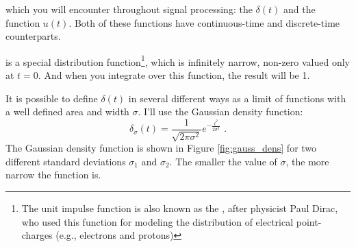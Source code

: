 %
% 
%
 which you will encounter throughout signal processing: the \emph{} $\delta(t)$ and the \emph{} function $u(t)$. Both of these functions have continuous-time and discrete-time counterparts.

 is a special distribution function\footnote{The unit impulse function is also known as the \emph{}, after physicist Paul Dirac, who used this function for modeling the distribution of electrical point-charges (e.g., electrons and protons)}, which is infinitely narrow, non-zero valued only at $t=0$. And when you integrate over this function, the result will be 1.

It is possible to define $\delta(t)$ in several different ways as a limit of functions with a well defined area and width $\sigma$. I'll use the Gaussian density function:
\begin{equation}
\delta_\sigma(t) = \frac{1}{\sqrt{2\pi \sigma^2}}e^{-\frac{t^2}{2\sigma^2}}\,\,.
\end{equation}
The Gaussian density function is shown in Figure \ref{fig:gauss_dens} for two different standard deviations $\sigma_1$ and $\sigma_2$. The smaller the value of $\sigma$, the more narrow the function is.

